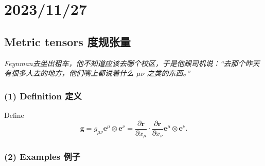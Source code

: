 \chapter{2023/11/27}\label{20231127}

\section{Metric tensors
度规张量}\label{metric-tensors-ux5ea6ux89c4ux5f20ux91cf-1}

\emph{Feynman去坐出租车，他不知道应该去哪个校区，于是他跟司机说：``去那个昨天有很多人去的地方，他们嘴上都说着什么
\(\mu\nu\) 之类的东西。''}

\subsection*{(1) Definition 定义}\label{definition-ux5b9aux4e49-1}

Define
\[\mathbf{g} = g_{\mu\nu} \boldsymbol{e}^{\mu} \otimes \boldsymbol{e}^{\nu} = \frac{\partial \boldsymbol{r}}{\partial x_\mu} \cdot \frac{\partial \boldsymbol{r}}{\partial x_\nu} \boldsymbol{e}^{\mu} \otimes \boldsymbol{e}^{\nu}.\]

\subsection*{(2) Examples 例子}\label{examples-ux4f8bux5b50}

